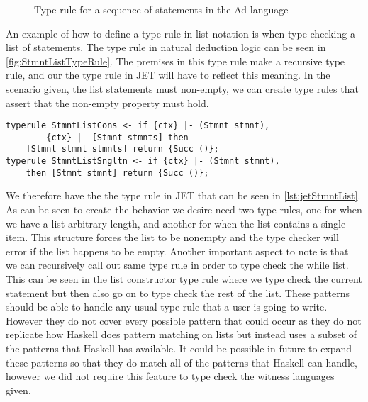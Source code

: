 \begin{figure}
    \begin{prooftree}
    \end{prooftree}
    \caption{Type rule for a sequence of statements in the Ad language}
    \label{fig:StmntListTypeRule}
\end{figure}

An example of how to define a type rule in list notation is when type checking a list of statements.
The type rule in natural deduction logic can be seen in \autoref{fig:StmntListTypeRule}.
The premises in this type rule make a recursive type rule, and our the type rule in JET will have to reflect this meaning.
In the scenario given, the list statements must non-empty, we can create type rules that assert that the non-empty property must hold.

\begin{lstlisting}[caption = Type rule in JET for a seqeunce of statements, label=lst:jetStmntList]
typerule StmntListCons <- if {ctx} |- (Stmnt stmnt), 
        {ctx} |- [Stmnt stmnts] then 
    [Stmnt stmnt stmnts] return {Succ ()};
typerule StmntListSngltn <- if {ctx} |- (Stmnt stmnt),
    then [Stmnt stmnt] return {Succ ()};
\end{lstlisting}

We therefore have the the type rule in JET that can be seen in \autoref{lst:jetStmntList}.
As can be seen to create the behavior we desire need two type rules, one for when we have a list arbitrary length, and another for when the list contains a single item.
This structure forces the list to be nonempty and the type checker will error if the list happens to be empty.
Another important aspect to note is that we can recursively call out same type rule in order to type check the while list.
This can be seen in the list constructor type rule where we type check the current statement but then also go on to type check the rest of the list.
These patterns should be able to handle any usual type rule that a user is going to write.
However they do not cover every possible pattern that could occur as they do not replicate how Haskell does pattern matching on lists but instead uses a subset of the patterns that Haskell has available.
It could be possible in future to expand these patterns so that they do match all of the patterns that Haskell can handle, however we did not require this feature to type check the witness languages given.

